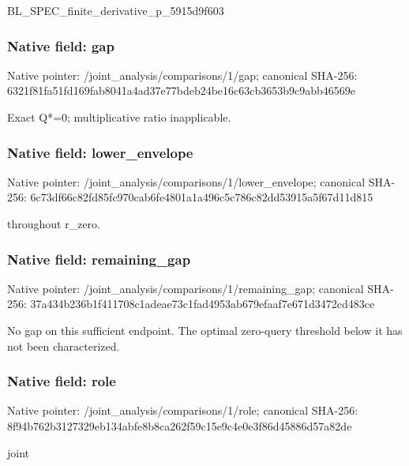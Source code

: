 \documentclass[10pt,a4paper]{article}
\begin{document}
\begingroup\raggedright\sloppy BL\_\allowbreak{}SPEC\_\allowbreak{}finite\_\allowbreak{}derivative\_\allowbreak{}p\_\allowbreak{}5915d9f603\par\endgroup

\subsubsection{Native field: gap}
Native pointer: /joint\_\allowbreak{}analysis/comparisons/1/gap; canonical SHA-256: 6321f81fa51fd169fab8041a4ad37e77bdeb24be16c63cb3653b9c9abb46569e

\begingroup\raggedright\sloppy Exact Q*=\allowbreak{}0;\allowbreak{} multiplicative ratio inapplicable.\par\endgroup

\subsubsection{Native field: lower\_\allowbreak{}envelope}
Native pointer: /joint\_\allowbreak{}analysis/comparisons/1/lower\_\allowbreak{}envelope; canonical SHA-256: 6c73df66c82fd85fc970cab6fe4801a1a496c5c786c82dd53915a5f67d11d815

\begingroup\raggedright{} throughout r\_\allowbreak{}zero.\par\endgroup

\subsubsection{Native field: remaining\_\allowbreak{}gap}
Native pointer: /joint\_\allowbreak{}analysis/comparisons/1/remaining\_\allowbreak{}gap; canonical SHA-256: 37a434b236b1f411708c1adeae73c1fad4953ab679efaaf7e671d3472cd483ce

\begingroup\raggedright\sloppy No gap on this sufficient endpoint. The optimal zero-query threshold below it has not been characterized.\par\endgroup

\subsubsection{Native field: role}
Native pointer: /joint\_\allowbreak{}analysis/comparisons/1/role; canonical SHA-256: 8f94b762b3127329eb134abfe8b8ca262f59c15e9c4e0e3f86d45886d57a82de

\begingroup\raggedright\sloppy joint\par\endgroup
\end{document}
